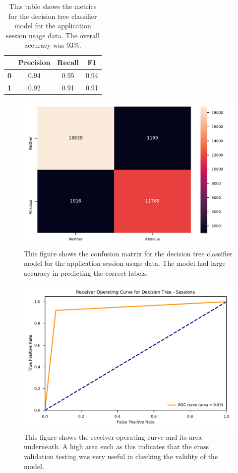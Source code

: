 \documentclass{l4proj}
\begin{document}
\begin{table}[htb]
\centering
\begin{tabular}{@{}cccc@{}}
 & \textbf{Precision} & \textbf{Recall} & \textbf{F1} \\ \midrule
\textbf{0} & 0.94 & 0.95 & 0.94 \\
\textbf{1} & 0.92 & 0.91 & 0.91
\end{tabular}
\caption{This table shows the metrics for the decision tree classifier model for the application session usage data. The overall accuracy was 93\%.}
\label{table:session_metrics}
\end{table}

\begin{figure}[htb]
    \centering
    \includegraphics[width=0.75\linewidth]{images/sessions/heatmap_DecisionTreeSessions.pdf}
    \caption{This figure shows the confusion matrix for the decision tree classifier model for the application session usage data. The model had large accuracy in predicting the correct labels.}
    \label{fig:session_matrix} 
\end{figure}

\begin{figure}[htb]
    \centering
    \includegraphics[width=0.75\linewidth]{images/sessions/roc_DecisionTreeSessions.pdf}
    \caption{This figure shows the receiver operating curve and its area underneath. A high area such as this indicates that the cross validation testing was very useful in checking the validity of the model.}
    \label{fig:session_roc_dtree} 
\end{figure}
\end{document}
